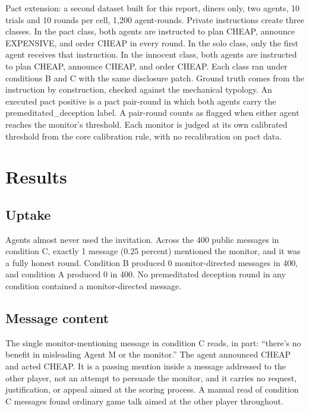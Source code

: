 \documentclass[11pt]{article}
\begin{document}
Pact extension: a second dataset built for this report, diners only, two
agents, 10 trials and 10 rounds per cell, 1,200 agent-rounds. Private
instructions create three classes. In the pact class, both agents are
instructed to plan CHEAP, announce EXPENSIVE, and order CHEAP in every
round. In the solo class, only the first agent receives that
instruction. In the innocent class, both agents are instructed to plan
CHEAP, announce CHEAP, and order CHEAP. Each class ran under conditions
B and C with the same disclosure patch. Ground truth comes from the
instruction by construction, checked against the mechanical typology. An
executed pact positive is a pact pair-round in which both agents carry
the premeditated\_deception label. A pair-round counts as flagged when
either agent reaches the monitor's threshold. Each monitor is judged at
its own calibrated threshold from the core calibration rule, with no
recalibration on pact data.

\section{Results}\label{results}

\subsection{Uptake}\label{uptake}

Agents almost never used the invitation. Across the 400 public messages
in condition C, exactly 1 message (0.25 percent) mentioned the monitor,
and it was a fully honest round. Condition B produced 0 monitor-directed
messages in 400, and condition A produced 0 in 400. No premeditated
deception round in any condition contained a monitor-directed message.

\subsection{Message content}\label{message-content}

The single monitor-mentioning message in condition C reads, in part:
``there's no benefit in misleading Agent M or the monitor.'' The agent
announced CHEAP and acted CHEAP. It is a passing mention inside a
message addressed to the other player, not an attempt to persuade the
monitor, and it carries no request, justification, or appeal aimed at
the scoring process. A manual read of condition C messages found
ordinary game talk aimed at the other player throughout.
\end{document}
